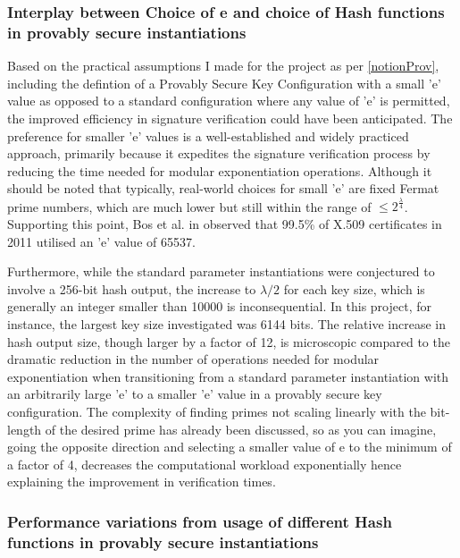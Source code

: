 \documentclass[]{final_report}
\theoremstyle{definition}
\begin{document}
\subsubsection{Interplay between Choice of e and choice of Hash functions in provably secure instantiations}

Based on the practical assumptions I made for the project as per \ref{notionProv}, including the defintion of a Provably Secure Key Configuration with a small 'e' value as opposed to a standard configuration where any value of 'e' is permitted, the improved efficiency in signature verification could have been anticipated. The preference for smaller 'e' values is a well-established and widely practiced approach, primarily because it expedites the signature verification process by reducing the time needed for modular exponentiation operations. Although it should be noted that typically, real-world choices for small 'e' are fixed Fermat prime numbers, which are much lower but still within the range of $\leqslant \displaystyle2^{\frac{\lambda}{4}}$. Supporting this point, Bos et al. in \cite{10.1007/978-3-642-32009-5_37} observed that 99.5\% of X.509 certificates in 2011 utilised an 'e' value of 65537.

Furthermore, while the standard parameter instantiations were conjectured to involve a 256-bit hash output, the increase to $\lambda / 2$ for each key size, which is generally an integer smaller than 10000 is inconsequential. In this project, for instance, the largest key size investigated was 6144 bits. The relative increase in hash output size, though larger by a factor of 12, is microscopic compared to the dramatic reduction in the number of operations needed for modular exponentiation when transitioning from a standard parameter instantiation with an arbitrarily large 'e' to a smaller 'e' value in a provably secure key configuration. The complexity of finding primes not scaling linearly with the bit-length of the desired prime has already been discussed, so as you can imagine, going the opposite direction and selecting a smaller value of e to the minimum of a factor of 4, decreases the computational workload exponentially hence explaining the improvement in verification times.

\subsubsection{Performance variations from usage of different Hash functions in provably secure instantiations}
\end{document}
